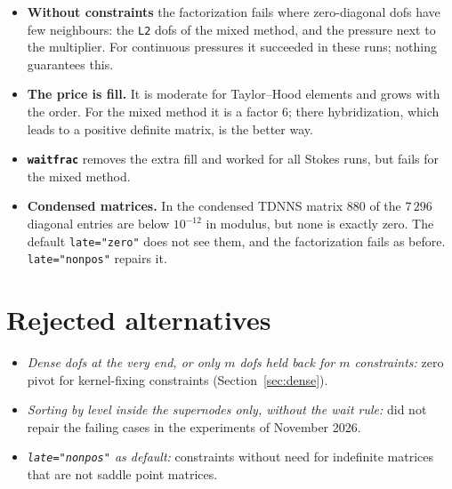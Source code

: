 \documentclass[10pt,a4paper]{article}
\newcommand{\code}[1]{\texttt{#1}}
\begin{document}
\begin{itemize}\setlength\itemsep{1pt}
\item \textbf{Without constraints} the factorization fails where zero-diagonal dofs have few neighbours: the \code{L2} dofs of the mixed method, and the pressure next to the multiplier. For continuous pressures it succeeded in these runs; nothing guarantees this.
\item \textbf{The price is fill.} It is moderate for Taylor--Hood elements and grows with the order. For the mixed method it is a factor 6; there hybridization, which leads to a positive definite matrix, is the better way.
\item \textbf{\code{waitfrac}} removes the extra fill and worked for all Stokes runs, but fails for the mixed method.
\item \textbf{Condensed matrices.} In the condensed TDNNS matrix 880 of the $7\,296$ diagonal entries are below $10^{-12}$ in modulus, but none is exactly zero. The default \code{late="zero"} does not see them, and the factorization fails as before. \code{late="nonpos"} repairs it.
\end{itemize}

\section{Rejected alternatives}
\begin{itemize}\setlength\itemsep{1pt}
\item \emph{Dense dofs at the very end, or only $m$ dofs held back for $m$ constraints:} zero pivot for kernel-fixing constraints (Section~\ref{sec:dense}).
\item \emph{Sorting by level inside the supernodes only, without the wait rule:} did not repair the failing cases in the experiments of November 2026.
\item \emph{\code{late="nonpos"} as default:} constraints without need for indefinite matrices that are not saddle point matrices.
\end{itemize}
\end{document}
